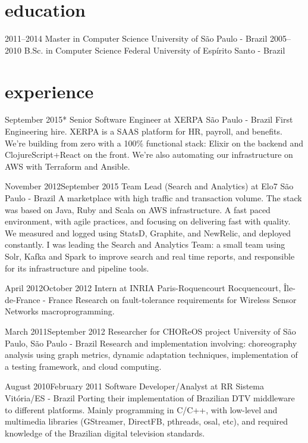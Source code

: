 \documentclass{friggeri-cv}
\begin{document}
\section{education}

\begin{entrylist}

\entry
  {2011–2014}
  {Master in Computer Science}
  {University of São Paulo - Brazil}{}
\entry
  {2005–2010}
  {B.Sc. in Computer Science}
  {Federal University of Espírito Santo - Brazil}{}
\end{entrylist}

\section{experience}

\workentry
    {September 2015}{*}
    {Senior Software Engineer at XERPA}
    {São Paulo - Brazil}
    {First Engineering hire. XERPA is a SAAS platform for HR, payroll, and benefits. We're building from zero with a 100\% functional stack: Elixir on the backend and ClojureScript+React on the front. We're also automating our infrastructure on AWS with Terraform and Ansible.}

\workentry
  {November 2012}{September 2015}
  {Team Lead (Search and Analytics) at Elo7}
  {São Paulo - Brazil}
  {A marketplace with high traffic and transaction volume. The stack was based on Java, Ruby and Scala on AWS infrastructure. A fast paced environment, with agile practices, and focusing on delivering fast with quality. We measured and logged using StatsD, Graphite, and NewRelic, and deployed constantly. I was leading the Search and Analytics Team: a small team using Solr, Kafka and Spark to improve search and real time reports, and responsible for its infrastructure and pipeline tools.}

\workentry
  {April 2012}{October 2012}
  {Intern at INRIA Paris-Roquencourt}
  {Rocquencourt, Île-de-France - France}
  {Research on fault-tolerance requirements for Wireless Sensor Networks macroprogramming.}

\workentry
  {March 2011}{September 2012}
  {Researcher for CHOReOS project}
  {University of São Paulo, São Paulo - Brazil}
  {Research and implementation involving: choreography analysis using graph metrics,
  dynamic adaptation techniques, implementation of a testing framework, and cloud computing.}

\workentry
  {August 2010}{February 2011}
  {Software Developer/Analyst at RR Sistema}
  {Vitória/ES - Brazil}
  {Porting their implementation of Brazilian DTV middleware to different platforms.
  Mainly programming in C/C++, with low-level and multimedia libraries (GStreamer, DirectFB, pthreads, osal, etc),
  and required knowledge of the Brazilian digital television standards.}
\end{document}
